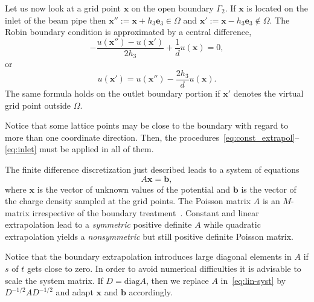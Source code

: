 Let us now look at a grid point $\mathbf{x}$ on the open boundary
$\Gamma_2$.  If $\mathbf{x}$ is located on the inlet of the beam pipe
then $\mathbf{x}'':=\mathbf{x}\! +\! h_3\mathbf{e}_3 \in \Omega$ and
$\mathbf{x}':=\mathbf{x}\! -\! h_3\mathbf{e}_3 \not\in \Omega$.  The
Robin boundary condition is approximated by a central difference,
\begin{displaymath}
  - \frac{u(\mathbf{x}'') - u(\mathbf{x}')}{2h_3}
  + \frac{1}{d}u(\mathbf{x}) = 0,
\end{displaymath}
or
\begin{equation}  \label{eq:inlet}
  u(\mathbf{x}') = u(\mathbf{x}'') - \frac{2h_3}{d}u(\mathbf{x}).
\end{equation}
The same formula holds on the outlet boundary portion if $\mathbf{x}'$
denotes the virtual grid point outside $\Omega$.

Notice that some lattice points may be close to the boundary with regard
to more than one coordinate direction.  Then, the
procedures~\eqref{eq:const_extrapol}--\eqref{eq:inlet} must be
applied in all of them.  

The finite difference discretization just described leads to a system of
equations
\begin{equation} \label{eq:lin-syst}
  A \mathbf{x} = \mathbf{b},
\end{equation}
where $\mathbf{x}$ is the vector of unknown values of the potential and
$\mathbf{b}$ is the vector of the charge density sampled at the grid
points.
The Poisson matrix $A$ is an $M$-matrix irrespective of the boundary
treatment~\cite{hack:94}.  Constant and linear extrapolation lead to a
\emph{symmetric} positive definite $A$ while quadratic extrapolation
yields a \emph{nonsymmetric} but still positive definite Poisson matrix.

Notice that the boundary extrapolation introduces large diagonal
elements in $A$ if $s$ of $t$ gets close to zero.  In order to avoid
numerical difficulties it is advisable to scale the system matrix.  If
$D = \mbox{diag}{A}$, then we replace $A$ in~\eqref{eq:lin-syst} by
$D^{-1/2} A D^{-1/2}$ and adapt $\mathbf{x}$ and $\mathbf{b}$
accordingly.  



